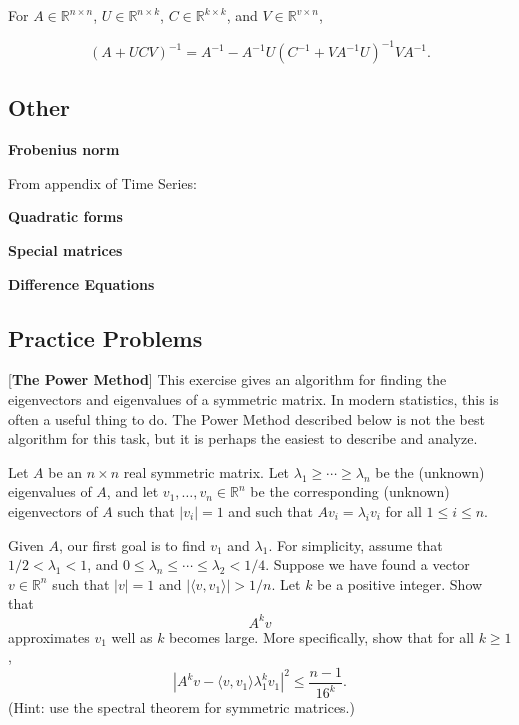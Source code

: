 \begin{theorem} For \(A \in \mathbb{R}^{n \times n}\), \(U \in \mathbb{R}^{n \times k}\), \(C \in \mathbb{R}^{k \times k}\), and \(V \in \mathbb{R}^{v \times n}\),

\[
(A + UCV)^{-1} = A^{-1} - A^{-1}U(C^{-1} + VA^{-1}U)^{-1}VA^{-1}.
\]

\end{theorem}

\begin{theorem}

\end{theorem}

\subsection{Other}

\textbf{Frobenius norm}

From appendix of Time Series:

\textbf{Quadratic forms}

\textbf{Special matrices}

\textbf{Difference Equations}

\subsection{Practice Problems}

[\textbf{The Power Method}]
This exercise gives an algorithm for finding the eigenvectors and eigenvalues of a symmetric matrix.  In modern statistics, this is often a useful thing to do.  The Power Method described below is not the best algorithm for this task, but it is perhaps the easiest to describe and analyze.

Let $A$ be an $n\times n$ real symmetric matrix.  Let $\lambda_{1}\geq\cdots\geq\lambda_{n}$ be the (unknown) eigenvalues of $A$, and let $v_{1},\ldots,v_{n}\in\mathbb{R}^{n}$ be the corresponding (unknown) eigenvectors of $A$ such that $|v_{i}|=1$ and such that $A v_{i}=\lambda_{i}v_{i}$ for all $1\leq i\leq n$.

Given $A$, our first goal is to find $v_{1}$ and $\lambda_{1}$.  For simplicity, assume that $1/2<\lambda_{1}<1$, and $0\leq \lambda_{n}\leq\cdots\leq\lambda_{2}<1/4$.  Suppose we have found a vector $v\in\mathbb{R}^{n}$ such that $|v|=1$ and $|\langle v,v_{1}\rangle|>1/n$. Let $k$ be a positive integer.  Show that
$$A^{k}v$$
approximates $v_{1}$ well as $k$ becomes large.  More specifically, show that for all $k\geq1$,
$$|A^{k}v - \langle v,v_{1}\rangle\lambda_{1}^{k}v_{1}|^{2}\leq\frac{n-1}{16^{k}}.$$
(Hint: use the spectral theorem for symmetric matrices.)

